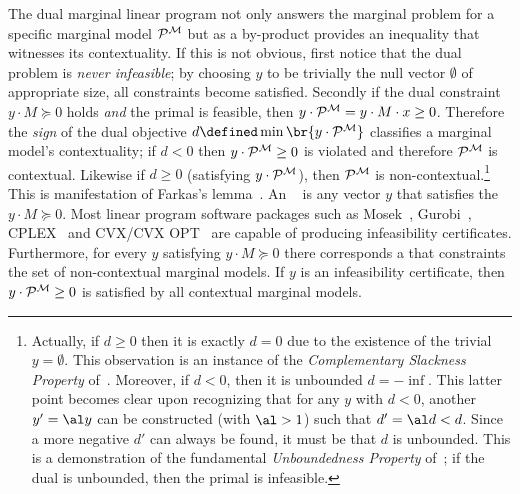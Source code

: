 \documentclass[aps, 10pt, english, twoside, pra, nofootinbib, tightenlines, longbibliography, superscriptaddress]{revtex4-1}
\begin{document}
    The dual marginal linear program not only answers the marginal problem for a specific marginal model $\probvec^{\mscenario}$ but as a by-product provides an inequality that witnesses its contextuality. If this is not obvious, first notice that the dual problem is \textit{never infeasible}; by choosing $y$ to be trivially the null vector $\emptyset$ of appropriate size, all constraints become satisfied. Secondly if the dual constraint $y \cdot M \succeq 0$ holds \textit{and} the primal is feasible, then $y \cdot \probvec^{\mscenario} =  y \cdot M \cdot x \geq 0$. Therefore the \textit{sign} of the dual objective $d \defined \min \br{y \cdot \probvec^{\mscenario}}$ classifies a marginal model's contextuality; if $d < 0$ then $y \cdot \probvec^{\mscenario} \geq 0$ is violated and therefore $\probvec^{\mscenario}$ is contextual. Likewise if $d \geq 0$ (satisfying $y \cdot \probvec^{\mscenario}$), then $\probvec^{\mscenario}$ is non-contextual.\footnote{Actually, if $d \geq 0$ then it is exactly $d = 0$ due to the existence of the trivial $y = \emptyset$. This observation is an instance of the \textit{Complementary Slackness Property} of~\cite{Bradley_1977}. Moreover, if $d < 0$, then it is unbounded $d = -\inf$. This latter point becomes clear upon recognizing that for any $y$ with $d < 0$, another $y' = \al y$ can be constructed (with $\al > 1$) such that $d' = \al d < d$. Since a more negative $d'$ can always be found, it must be that $d$ is unbounded. This is a demonstration of the fundamental \textit{Unboundedness Property} of~\cite{Bradley_1977}; if the dual is unbounded, then the primal is infeasible.} This is manifestation of Farkas's lemma~\cite{Schrijver_1998}. An ~\cite{Andersen_2001} is any vector $y$ that satisfies the $y \cdot M \succeq 0$. Most linear program software packages such as Mosek~\cite{Mosek_2016}, Gurobi~\cite{Gurobi_2016}, CPLEX~\cite{Cplex_2016} and CVX/CVX OPT~\cite{CVX_2016,CVX_Opt_2016} are capable of producing infeasibility certificates. Furthermore, for every $y$ satisfying $y \cdot M \succeq 0$ there corresponds a  that constraints the set of non-contextual marginal models. If $y$ is an infeasibility certificate, then $y \cdot \probvec^{\mscenario} \geq 0$ is satisfied by all contextual marginal models.
\end{document}
